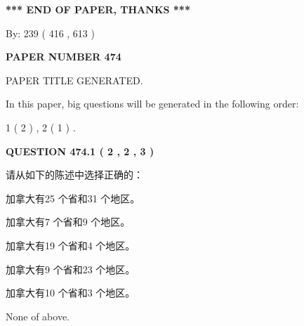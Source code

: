 \documentclass{ctexart}
\begin{document}
   
   
   
\vspace{1.0in} 
{\textbf{\large{ *** END OF PAPER, THANKS *** }}} 
   
   
\hspace{1.0in} By: 
 239 ( 416 ,  613 )
   
   
   
   
\newpage 
\setcounter{page}{ 
   474001 } 
   
   
   
   
 {\textbf{ \Large{ PAPER NUMBER  474  }}}
   
   
\vspace{0.2in}
   
   
   
   
   
   
   
   
 \vspace{0.2in}
 
 
 
 
   
   
 PAPER TITLE GENERATED.
   
   
   
\vspace{0.2in}
   
In this paper, big questions will be generated in the following order: 
   
   
   1 ( 2 )
 ,
   2 ( 1 )
 .
  
\vspace{0.2in}
  
{\textbf{\Large{QUESTION
474.1 
 ( 2 , 2 , 3 )
}}}
  
  
请从如下的陈述中选择正确的：
 
 
加拿大有25 个省和31 个地区。
 
 
加拿大有7 个省和9 个地区。
 
 
加拿大有19 个省和4 个地区。
 
 
加拿大有9 个省和23 个地区。
 
 
加拿大有10 个省和3 个地区。
 
 
 None of above.
 
 
\noindent{}
 
\end{document}
